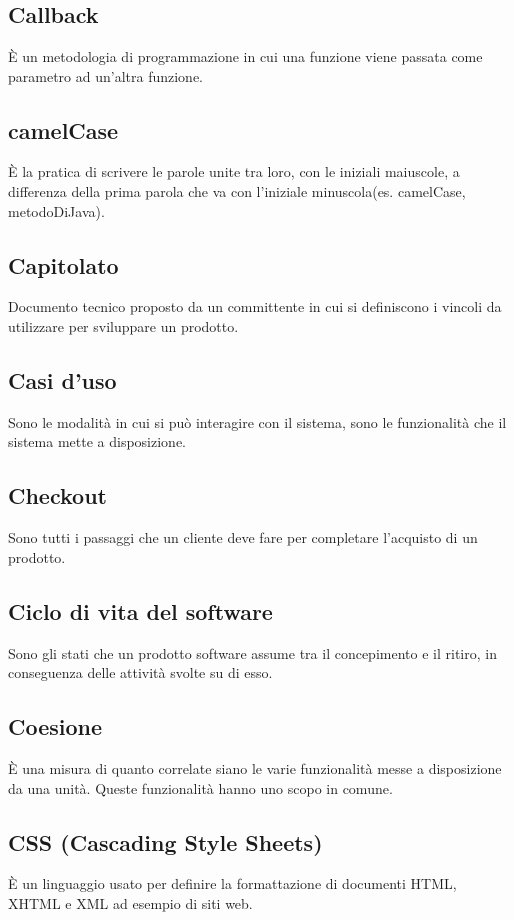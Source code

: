 \section{}

\subsection*{Callback} È un metodologia di programmazione in cui una funzione viene passata come parametro ad un'altra funzione.

\subsection*{camelCase} È la pratica di scrivere le parole unite tra loro, con le iniziali maiuscole, a differenza della prima parola che va con l'iniziale minuscola(es. camelCase, metodoDiJava).

\subsection*{Capitolato} Documento tecnico proposto da un committente in cui si definiscono i vincoli da utilizzare per sviluppare un prodotto.

\subsection*{Casi d'uso} Sono le modalità in cui si può interagire con il sistema, sono le funzionalità che il sistema mette a disposizione.

\subsection*{Checkout} Sono tutti i passaggi che un cliente deve fare per completare l'acquisto di un prodotto.

\subsection*{Ciclo di vita del software} Sono gli stati che un prodotto software assume tra il concepimento e il ritiro, in conseguenza delle attività svolte su di esso.

\subsection*{Coesione} È una misura di quanto correlate siano le varie funzionalità messe a disposizione da una unità. Queste funzionalità hanno uno scopo in comune.

\subsection*{CSS (Cascading Style Sheets)} È un linguaggio usato per definire la formattazione di documenti HTML, XHTML e XML ad esempio di siti web.
